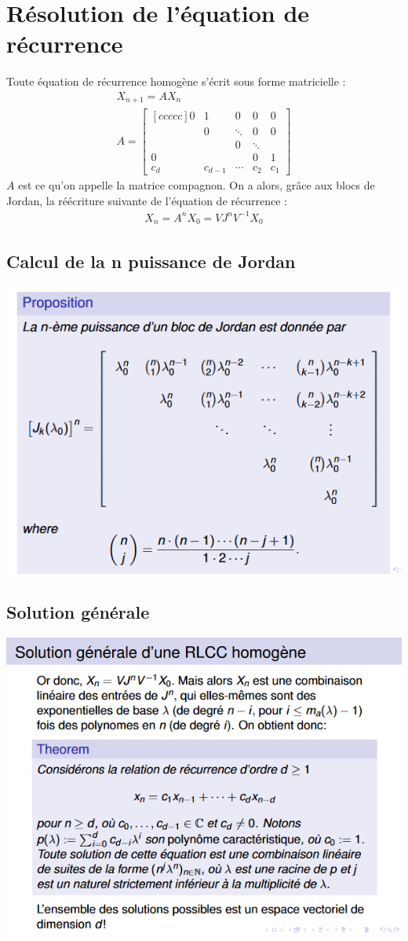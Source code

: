 \documentclass[a4paper]{book}
\begin{document}
\section{Résolution de l'équation de récurrence}
Toute équation de récurrence homogène s'écrit sous forme matricielle :
\begin{gather}
    X_{n+1} = AX_n \\
    A = \begin{bmatrix}[ccccc]
    0 & 1 & 0 & 0 & 0 \\
    & 0 & \ddots & 0 & 0 \\
    &&0&\ddots&\\
    0&&&0&1 \\
    c_d&c_{d-1}&\cdots&c_2&c_1
    \end{bmatrix}
\end{gather}
$A$ est ce qu'on appelle la matrice compagnon. On a alors, grâce aux blocs de Jordan, la réécriture suivante de l'équation de récurrence :
\begin{gather}
    X_n = A^nX_0 = VJ^nV^{-1}X_0
\end{gather}
\subsection{Calcul de la n puissance de Jordan}
\begin{center}
    \includegraphics[width=.7\linewidth]{puissance_jordan.png}
\end{center}
\subsection{Solution générale}
\begin{center}
    \includegraphics[width=.7\linewidth]{solution.png}
\end{center}
\end{document}
